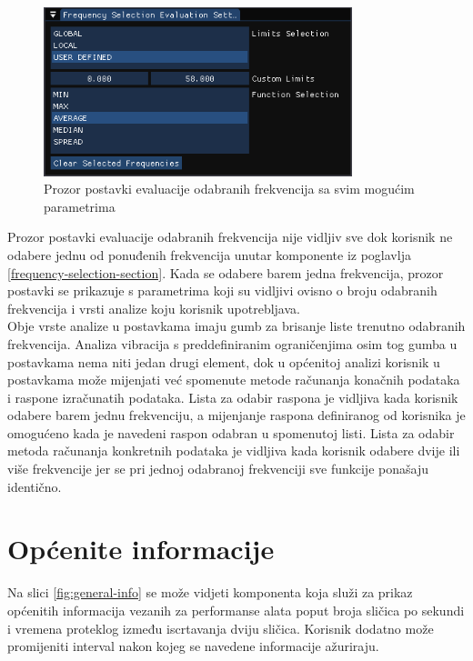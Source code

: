 \documentclass[times, utf8, diplomski]{fer}
\begin{document}
\begin{figure} [H]
	\centering
    \includegraphics[width=0.8\textwidth]{frq_sel_eval_settings.png}
    \caption{Prozor postavki evaluacije odabranih frekvencija sa svim mogućim parametrima}
    \label{fig:frq-sel-eval-settings}
\end{figure}

Prozor postavki evaluacije odabranih frekvencija nije vidljiv sve dok korisnik ne odabere jednu od ponuđenih frekvencija unutar komponente iz poglavlja \ref{frequency-selection-section}. Kada se odabere barem jedna frekvencija, prozor postavki se prikazuje s parametrima koji su vidljivi ovisno o broju odabranih frekvencija i vrsti analize koju korisnik upotrebljava.\\

Obje vrste analize u postavkama imaju gumb za brisanje liste trenutno odabranih frekvencija. Analiza vibracija s preddefiniranim ograničenjima osim tog gumba u postavkama nema niti jedan drugi element, dok u općenitoj analizi korisnik u postavkama može mijenjati već spomenute metode računanja konačnih podataka i raspone izračunatih podataka. Lista za odabir raspona je vidljiva kada korisnik odabere barem jednu frekvenciju, a mijenjanje raspona definiranog od korisnika je omogućeno kada je navedeni raspon odabran u spomenutoj listi. Lista za odabir metoda računanja konkretnih podataka je vidljiva kada korisnik odabere dvije ili više frekvencije jer se pri jednoj odabranoj frekvenciji sve funkcije ponašaju identično.


\section{Općenite informacije} \label{general-info-section}

Na slici \ref{fig:general-info} se može vidjeti komponenta koja služi za prikaz općenitih informacija vezanih za performanse alata poput broja sličica po sekundi i vremena proteklog između iscrtavanja dviju sličica. Korisnik dodatno može promijeniti interval nakon kojeg se navedene informacije ažuriraju.
\end{document}
